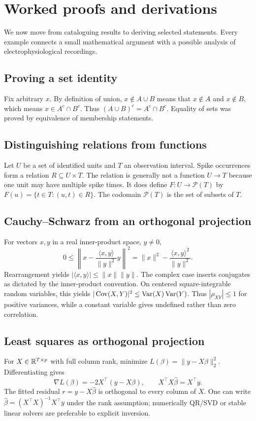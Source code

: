 \chapter{Worked proofs and derivations}
We now move from cataloguing results to deriving selected statements.
Every example connects a small mathematical argument with a possible
analysis of electrophysiological recordings.

\section{Proving a set identity}
Fix arbitrary $x$. By definition of union,
$x\notin A\cup B$ means that $x\notin A$ and $x\notin B$,
which means $x\in A^c\cap B^c$.
Thus $(A\cup B)^c=A^c\cap B^c$.
Equality of sets was proved by equivalence of membership statements.

\section{Distinguishing relations from functions}
Let $U$ be a set of identified units and $T$ an observation interval.
Spike occurrences form a relation $R\subseteq U\times T$.
The relation is generally not a function $U\to T$ because
one unit may have multiple spike times. It does define
$F:U\to\mathcal P(T)$ by
$F(u)=\{t\in T:(u,t)\in R\}$.
The codomain $\mathcal P(T)$ is the set of subsets of $T$.

\section{Cauchy--Schwarz from an orthogonal projection}
For vectors $x,y$ in a real inner-product space, $y\ne0$,
\[
0\leq\left\|x-\frac{\langle x,y\rangle}{\|y\|^2}y\right\|^2
=\|x\|^2-\frac{\langle x,y\rangle^2}{\|y\|^2}.
\]
Rearrangement yields
$|\langle x,y\rangle|\leq\|x\|\|y\|$.
The complex case inserts conjugates as dictated by the
inner-product convention. On centered square-integrable random
variables, this yields
$|\operatorname{Cov}(X,Y)|^2\leq\operatorname{Var}(X)\operatorname{Var}(Y)$.
Thus $|\rho_{XY}|\leq1$ for positive variances, while a constant
variable gives undefined rather than zero correlation.

\section{Least squares as orthogonal projection}
For $X\in\mathbb{R}^{T\times p}$ with full column rank, minimize
$L(\beta)=\|y-X\beta\|_2^2$.
Differentiating gives
\[
\nabla L(\beta)=-2X^\top(y-X\beta),\qquad
X^\top X\widehat\beta=X^\top y.
\]
The fitted residual $r=y-X\widehat\beta$ is orthogonal to
every column of $X$. One can write
$\widehat\beta=(X^\top X)^{-1}X^\top y$ under the
rank assumption; numerically QR/SVD or stable linear solvers
are preferable to explicit inversion.

